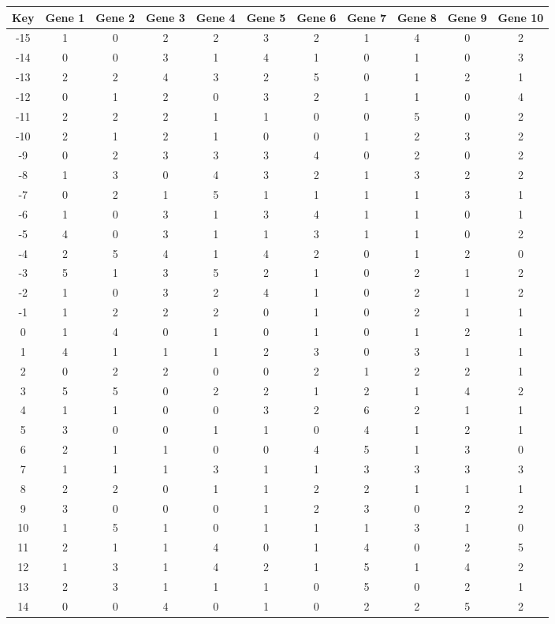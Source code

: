 \begin{tabular}{|c|c|c|c|c|c|c|c|c|c|c|}
\hline
Key & Gene 1 & Gene 2 & Gene 3 & Gene 4 & Gene 5 & Gene 6 & Gene 7 & Gene 8 & Gene 9 & Gene 10 \\
\hline
-15 & 1 & 0 & 2 & 2 & 3 & 2 & 1 & 4 & 0 & 2 \\
-14 & 0 & 0 & 3 & 1 & 4 & 1 & 0 & 1 & 0 & 3 \\
-13 & 2 & 2 & 4 & 3 & 2 & 5 & 0 & 1 & 2 & 1 \\
-12 & 0 & 1 & 2 & 0 & 3 & 2 & 1 & 1 & 0 & 4 \\
-11 & 2 & 2 & 2 & 1 & 1 & 0 & 0 & 5 & 0 & 2 \\
-10 & 2 & 1 & 2 & 1 & 0 & 0 & 1 & 2 & 3 & 2 \\
-9 & 0 & 2 & 3 & 3 & 3 & 4 & 0 & 2 & 0 & 2 \\
-8 & 1 & 3 & 0 & 4 & 3 & 2 & 1 & 3 & 2 & 2 \\
-7 & 0 & 2 & 1 & 5 & 1 & 1 & 1 & 1 & 3 & 1 \\
-6 & 1 & 0 & 3 & 1 & 3 & 4 & 1 & 1 & 0 & 1 \\
-5 & 4 & 0 & 3 & 1 & 1 & 3 & 1 & 1 & 0 & 2 \\
-4 & 2 & 5 & 4 & 1 & 4 & 2 & 0 & 1 & 2 & 0 \\
-3 & 5 & 1 & 3 & 5 & 2 & 1 & 0 & 2 & 1 & 2 \\
-2 & 1 & 0 & 3 & 2 & 4 & 1 & 0 & 2 & 1 & 2 \\
-1 & 1 & 2 & 2 & 2 & 0 & 1 & 0 & 2 & 1 & 1 \\
0 & 1 & 4 & 0 & 1 & 0 & 1 & 0 & 1 & 2 & 1 \\
1 & 4 & 1 & 1 & 1 & 2 & 3 & 0 & 3 & 1 & 1 \\
2 & 0 & 2 & 2 & 0 & 0 & 2 & 1 & 2 & 2 & 1 \\
3 & 5 & 5 & 0 & 2 & 2 & 1 & 2 & 1 & 4 & 2 \\
4 & 1 & 1 & 0 & 0 & 3 & 2 & 6 & 2 & 1 & 1 \\
5 & 3 & 0 & 0 & 1 & 1 & 0 & 4 & 1 & 2 & 1 \\
6 & 2 & 1 & 1 & 0 & 0 & 4 & 5 & 1 & 3 & 0 \\
7 & 1 & 1 & 1 & 3 & 1 & 1 & 3 & 3 & 3 & 3 \\
8 & 2 & 2 & 0 & 1 & 1 & 2 & 2 & 1 & 1 & 1 \\
9 & 3 & 0 & 0 & 0 & 1 & 2 & 3 & 0 & 2 & 2 \\
10 & 1 & 5 & 1 & 0 & 1 & 1 & 1 & 3 & 1 & 0 \\
11 & 2 & 1 & 1 & 4 & 0 & 1 & 4 & 0 & 2 & 5 \\
12 & 1 & 3 & 1 & 4 & 2 & 1 & 5 & 1 & 4 & 2 \\
13 & 2 & 3 & 1 & 1 & 1 & 0 & 5 & 0 & 2 & 1 \\
14 & 0 & 0 & 4 & 0 & 1 & 0 & 2 & 2 & 5 & 2 \\
\hline
\end{tabular}